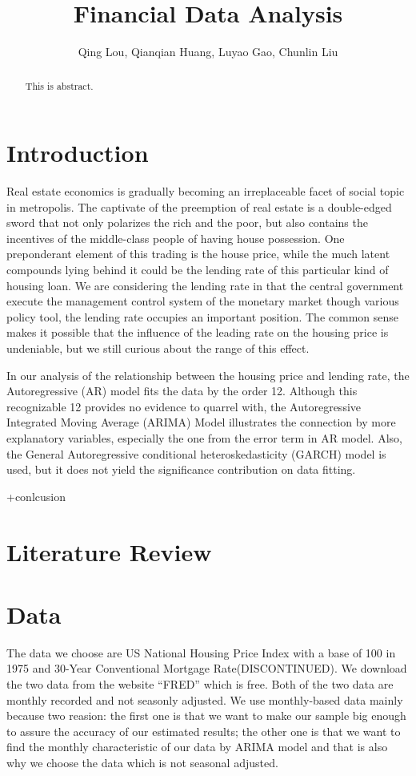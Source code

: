 \documentclass[12pt,letterpaper]{article}
\begin{document}
\title{\textbf{\Large Financial Data Analysis}}
\author{Qing Lou, Qianqian Huang, Luyao Gao, Chunlin Liu}
\date{}
\maketiitle 

\thispagestyle{empty}
\tableofcontents
\newpage
\clearpage

\begin{abstract}
This is abstract.
\end{abstract}

\section{Introduction}

Real estate economics is gradually becoming an irreplaceable facet of social topic in metropolis. 
The captivate of the preemption of real estate is a double-edged sword that not only polarizes the rich and the poor, but also contains the incentives of the middle-class people of having house possession.
One preponderant element of this trading is the house price, while the much latent compounds lying behind it could be the lending rate of this particular kind of housing loan.
We are considering the lending rate in that the central government execute the management control system of the monetary market though various policy tool, the lending rate occupies an important position.
The common sense makes it possible that the influence of the leading rate on the housing price is undeniable, but we still curious about the range of this effect.

In our analysis of the relationship between the housing price and lending rate, the Autoregressive (AR) model fits the data by the order 12. 
Although this recognizable 12 provides no evidence to quarrel with, the Autoregressive Integrated Moving Average (ARIMA) Model illustrates the connection by more explanatory variables, especially the one from the error term in AR model.
Also, the General Autoregressive conditional heteroskedasticity (GARCH) model is used, but it does not yield the significance contribution on data fitting.

+conlcusion

\section{Literature Review}

\section{Data}
The data we choose are US National Housing Price Index with a base of 100 in 1975 and 30-Year Conventional Mortgage Rate(DISCONTINUED). 
We download the two data from the website ``FRED'' which is free. 
Both of the two data are monthly recorded and not seasonly adjusted. 
We use monthly-based data mainly because two reasion: the first one is that we want to make our sample big enough to assure the accuracy of our estimated results; the other one is that we  want to find the monthly characteristic of our data by ARIMA model and that is also why we choose the data which is not seasonal adjusted.
         
\end{document}
